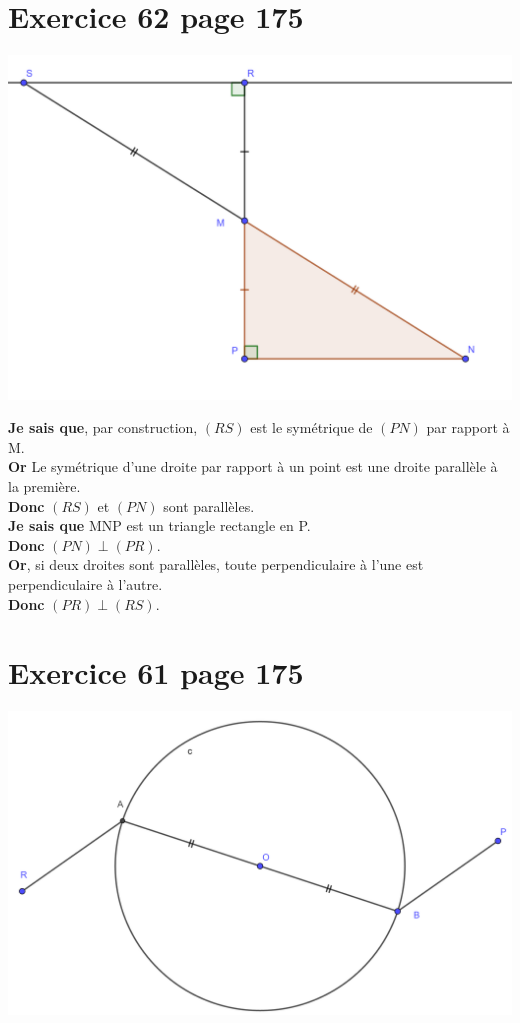 \documentclass[12pt,a4paper]{article}
\begin{document}
\section*{Exercice 62 page 175}

\begin{center}
	\includegraphics[scale=0.2]{62}
\end{center}

 \noindent \textbf{Je sais que}, par construction, $(RS)$ est le symétrique de $(PN)$ par rapport à M.\\
 \textbf{Or} Le symétrique d'une droite par rapport à un point est une droite parallèle à la première.\\
 \textbf{Donc} $(RS)$ et $(PN)$ sont parallèles.\\
 
 \noindent \textbf{Je sais que} MNP est un triangle rectangle en P.\\
 \textbf{Donc} $(PN) \perp (PR)$.\\
 \textbf{Or}, si deux droites sont parallèles, toute perpendiculaire à l’une est perpendiculaire à l’autre.\\
 \textbf{Donc} $(PR) \perp (RS)$.


\section*{Exercice 61 page 175}

\begin{center}
	\includegraphics[scale=0.2]{61}
\end{center}
\end{document}
